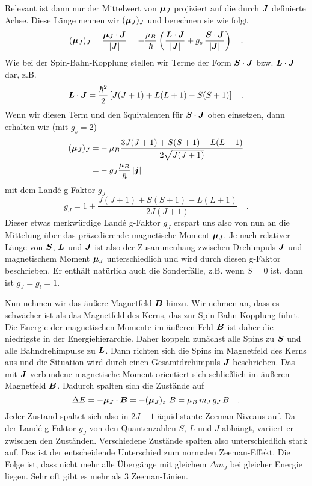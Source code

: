 Relevant ist dann nur der Mittelwert von  $\boldsymbol{\mu}_J $ projiziert auf die durch $\boldsymbol{J}$ definierte Achse.  Diese Länge nennen wir $(\boldsymbol{\mu}_J)_J$ und berechnen sie wie folgt
\begin{equation}
    (\boldsymbol{\mu}_J)_J = \frac{\boldsymbol{\mu}_J \cdot \boldsymbol{J}}{|\boldsymbol{J}|}
    = - \frac{\mu_B}{\hbar} \left(
        \frac{\boldsymbol{L} \cdot \boldsymbol{J}}{|\boldsymbol{J}|}
        +  g_s \,\frac{\boldsymbol{S} \cdot \boldsymbol{J}}{|\boldsymbol{J}|}
    \right)  \quad .
\end{equation}
Wie bei der Spin-Bahn-Kopplung stellen wir Terme der Form $\boldsymbol{S} \cdot \boldsymbol{J}$ bzw. $\boldsymbol{L} \cdot \boldsymbol{J}$  dar, z.B.
\begin{equation}
    \boldsymbol{L} \cdot \boldsymbol{J} = \frac{\hbar^2}{2}
    \left[
  J (J+1) + L(L+1) - S(S+1)
    \right]  \quad .
\end{equation}
Wenn wir diesen Term und den äquivalenten für  $\boldsymbol{S} \cdot \boldsymbol{J}$  oben einsetzen, dann erhalten wir (mit $g_s = 2$)
\begin{align}
    (\boldsymbol{\mu}_J)_J = & - \mu_B \frac{3 J (J+1)+ S(S+1) - L(L+1)}{2 \sqrt{J (J+1)}} \\
    = & - g_J \frac{\mu_B}{\hbar} \, |\boldsymbol{j}|
\end{align}
mit dem Landé-g-Faktor $g_J$ 
\begin{equation}
    g_J = 1 + \frac{J (J+1)+ S(S+1) - L(L+1)}{2 J (J+1)}   \quad .
\end{equation}
Dieser etwas merkwürdige Landé g-Faktor $g_J$ erspart uns also von nun an die Mittelung über das präzedierende magnetische Moment $\boldsymbol{\mu}_J$. Je nach relativer Länge von $\boldsymbol{S}$, $\boldsymbol{L}$ und $\boldsymbol{J}$ ist also der Zusammenhang zwischen Drehimpuls $\boldsymbol{J}$ und magnetischem Moment $\boldsymbol{\mu}_J$ unterschiedlich und wird durch diesen g-Faktor beschrieben. Er enthält natürlich auch die Sonderfälle, z.B. wenn $S=0$ ist, dann ist $g_J = g_l = 1$.





Nun nehmen wir das äußere Magnetfeld $\boldsymbol{B}$ hinzu. Wir nehmen an, dass es schwächer ist als das Magnetfeld des Kerns, das zur Spin-Bahn-Kopplung führt. Die Energie der magnetischen Momente im äußeren Feld $\boldsymbol{B}$ ist daher die niedrigste in der Energiehierarchie. Daher koppeln zunächst alle Spins zu $\boldsymbol{S}$ und alle Bahndrehimpulse zu $\boldsymbol{L}$. Dann richten sich die Spins im Magnetfeld des Kerns aus und die Situation wird durch einen Gesamtdrehimpuls $\boldsymbol{J}$ beschrieben. Das mit $\boldsymbol{J}$ verbundene magnetische Moment orientiert sich schließlich im äußeren Magnetfeld $\boldsymbol{B}$. Dadurch spalten sich die Zustände  auf
\begin{equation}
    \Delta E = - \boldsymbol{\mu}_J \cdot \boldsymbol{B} =-  (\boldsymbol{\mu}_J)_z  \, \, B =  \mu_B \, m_J \, g_J \, B  \quad .
\end{equation}
Jeder Zustand spaltet sich also in $2J+1$ äquidistante Zeeman-Niveaus auf. Da der Landé g-Faktor $g_J$ von den Quantenzahlen $S$, $L$ und $J$ abhängt, variiert er zwischen den Zuständen. Verschiedene Zustände spalten also unterschiedlich stark auf. Das ist der entscheidende Unterschied zum normalen Zeeman-Effekt. Die Folge ist, dass nicht mehr alle Übergänge mit gleichem $\Delta m_J$ bei gleicher Energie liegen. Sehr oft gibt es mehr als 3 Zeeman-Linien. 

